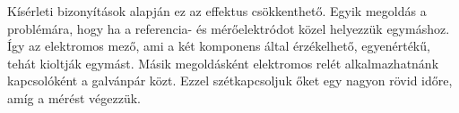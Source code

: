 Kísérleti bizonyítások alapján ez az effektus csökkenthető. Egyik megoldás a problémára, hogy ha a referencia- és mérőelektródot közel helyezzük egymáshoz. Így az elektromos mező, ami a két komponens által érzékelhető, egyenértékű, tehát kioltják egymást. Másik megoldásként elektromos relét alkalmazhatnánk kapcsolóként a galvánpár közt. Ezzel szétkapcsoljuk őket egy nagyon rövid időre, amíg a mérést végezzük.




